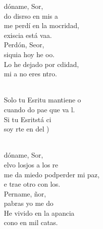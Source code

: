 \documentclass[12pt]{article}
\begin{document}
\begin{multicols*}{2}
\begin{cancion}%
	dóname, Sor, \\
	do disrso en mis a \\
	me perdí en la mocridad,\\
	 exiscia está vaa. \\
	Perdón, Seor,\\
	 siquia hoy he oo. \\
	Lo he dejado por cdidad,\\
	 mi a no eres ntro.\\\jump\\
	\begin{chorus}%
	Solo tu Esritu  mantiene o \\
	cuando do pae que va l.\\
	Si tu Esritstá ci\\
	soy rte en del ) \\
	\end{chorus}%
	\jump\\
	dóname, Sor, \\
	elvo losjos a los re \\
	me da miedo podperder mi paz,\\
	e trae otro con los.\\
\jump
	Pername, ñor,\\
	 pabras yo me do \\
	He vivido en la apancia\\
	cono en mil catas.\\
\end{cancion}%


\end{multicols*}
\end{document}
